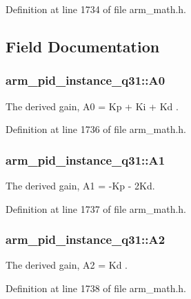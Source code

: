 Definition at line 1734 of file arm\-\_\-math.\-h.



\subsection{Field Documentation}
\hypertarget{structarm__pid__instance__q31_aa5332635ce9c7078cdb4c1ecf442eadd}{
\subsubsection[{A0}]{ arm\-\_\-pid\-\_\-instance\-\_\-q31\-::\-A0}}\label{structarm__pid__instance__q31_aa5332635ce9c7078cdb4c1ecf442eadd}
The derived gain, A0 = Kp + Ki + Kd . 

Definition at line 1736 of file arm\-\_\-math.\-h.

\hypertarget{structarm__pid__instance__q31_a2f7492bd6fb92fae5e2de7fbbec39b0e}{
\subsubsection[{A1}]{ arm\-\_\-pid\-\_\-instance\-\_\-q31\-::\-A1}}\label{structarm__pid__instance__q31_a2f7492bd6fb92fae5e2de7fbbec39b0e}
The derived gain, A1 = -\/\-Kp -\/ 2\-Kd. 

Definition at line 1737 of file arm\-\_\-math.\-h.

\hypertarget{structarm__pid__instance__q31_a3e34537c53af4f9ad7bfffa4dff27c82}{
\subsubsection[{A2}]{ arm\-\_\-pid\-\_\-instance\-\_\-q31\-::\-A2}}\label{structarm__pid__instance__q31_a3e34537c53af4f9ad7bfffa4dff27c82}
The derived gain, A2 = Kd . 

Definition at line 1738 of file arm\-\_\-math.\-h.

